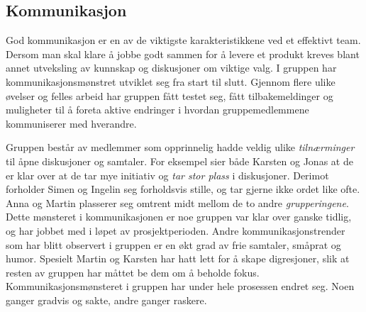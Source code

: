 \subsection{Kommunikasjon}


God kommunikasjon er en av de viktigste karakteristikkene ved et effektivt team.
Dersom man skal klare å jobbe godt sammen for å levere et produkt kreves blant annet utveksling av kunnskap og diskusjoner om viktige valg.
I gruppen har kommunikasjonsmønstret utviklet seg fra start til slutt.
Gjennom flere ulike øvelser og felles arbeid har gruppen fått testet seg, fått tilbakemeldinger og muligheter til å foreta aktive endringer i hvordan gruppemedlemmene kommuniserer med hverandre.

Gruppen består av medlemmer som opprinnelig hadde veldig ulike \textit{tilnærminger} til åpne diskusjoner og samtaler.
For eksempel sier både Karsten og Jonas at de er klar over at de tar mye initiativ og \textit{tar stor plass} i diskusjoner.
Derimot forholder Simen og Ingelin seg forholdsvis stille, og tar gjerne ikke ordet like ofte.
Anna og Martin plasserer seg omtrent midt mellom de to andre \textit{grupperingene}.
Dette mønsteret i kommunikasjonen er noe gruppen var klar over ganske tidlig, og har jobbet med i løpet av prosjektperioden.
Andre kommunikasjonstrender som har blitt observert i gruppen er en økt grad av frie samtaler, småprat og humor. Spesielt Martin og Karsten har hatt lett for å skape digresjoner, slik at resten av gruppen har måttet be dem om å beholde fokus. 
Kommunikasjonsmønsteret i gruppen har under hele prosessen endret seg.
Noen ganger gradvis og sakte, andre ganger raskere. 










